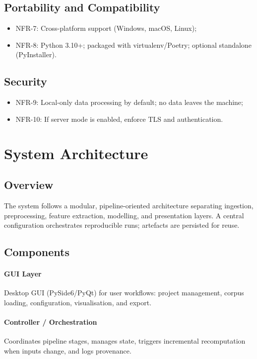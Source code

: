 \subsection{Portability and Compatibility}
\begin{itemize}
    \item NFR-7: Cross-platform support (Windows, macOS, Linux);
    \item NFR-8: Python 3.10+; packaged with virtualenv/Poetry; optional standalone (PyInstaller).
\end{itemize}

\subsection{Security}
\begin{itemize}
    \item NFR-9: Local-only data processing by default; no data leaves the machine;
    \item NFR-10: If server mode is enabled, enforce TLS and authentication.
\end{itemize}

\section{System Architecture}
\subsection{Overview}
The system follows a modular, pipeline-oriented architecture separating ingestion, preprocessing, feature extraction, modelling, and presentation layers. A central configuration orchestrates reproducible runs; artefacts are persisted for reuse.

\subsection{Components}
\paragraph{GUI Layer}
Desktop GUI (PySide6/PyQt) for user workflows: project management, corpus loading, configuration, visualisation, and export.

\paragraph{Controller / Orchestration}
Coordinates pipeline stages, manages state, triggers incremental recomputation when inputs change, and logs provenance.

